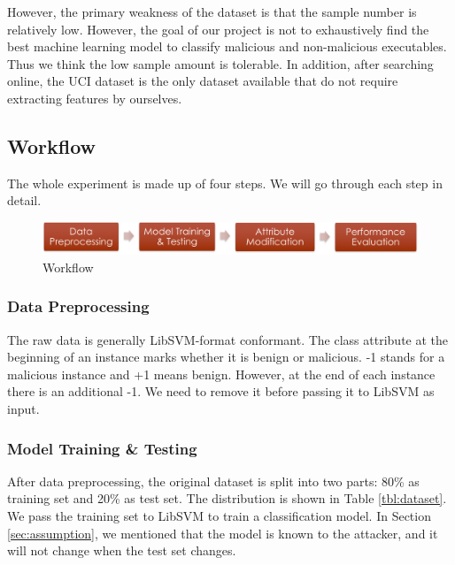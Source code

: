 \documentclass[11pt]{article}
\begin{document}
However, the primary weakness of the dataset is that the sample number is relatively low. However, the goal of our project is not to exhaustively find the best machine learning model to classify malicious and non-malicious executables. Thus we think the low sample amount is tolerable. In addition, after searching online, the UCI dataset is the only dataset available that do not require extracting features by ourselves.


\subsection{Workflow}
The whole experiment is made up of four steps. %
We will go through each step in detail.

\begin{figure}[htbp]
\label{fig:workflow}
\centering
\includegraphics*[width=\textwidth]{fig/workflow.png}
\caption{Workflow}
\end{figure}

\subsubsection{Data Preprocessing}
The raw data is generally LibSVM-format conformant. The class attribute at the beginning of an instance marks whether it is benign or malicious. -1 stands for a malicious instance and +1 means benign. However, at the end of each instance there is an additional -1. We need to remove it before passing it to LibSVM as input.

\subsubsection{Model Training \& Testing}
After data preprocessing, the original dataset is split into two parts: 80\% as training set and 20\% as test set. The distribution is shown in Table \ref{tbl:dataset}. We pass the training set to LibSVM to train a classification model. In Section \ref{sec:assumption}, we mentioned that the model is known to the attacker, and it will not change when the test set changes. %
\end{document}
